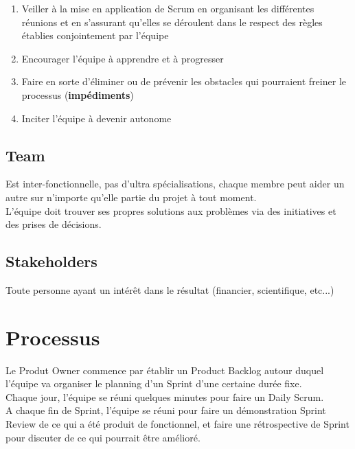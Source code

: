 \documentclass{report}
\begin{document}
			\begin{enumerate}
				\item Veiller à la mise en application de Scrum en organisant les différentes réunions et en s'assurant qu'elles se déroulent dans le respect des règles établies conjointement par l'équipe
				\item Encourager l'équipe à apprendre et à progresser
				\item Faire en sorte d'éliminer ou de prévenir les obstacles qui pourraient freiner le processus (\textbf{impédiments})
				\item Inciter l'équipe à devenir autonome
			\end{enumerate}

		\subsection{Team}

			Est inter-fonctionnelle, pas d'ultra spécialisations, chaque membre peut aider un autre sur n'importe qu'elle partie du projet à tout moment.\\

			L'équipe doit trouver ses propres solutions aux problèmes via des initiatives et des prises de décisions.\\

		\subsection{Stakeholders}

			Toute personne ayant un intérêt dans le résultat (financier, scientifique, etc...)\\

	\section{Processus}

		Le Produt Owner commence par établir un Product Backlog autour duquel l'équipe va organiser le planning d'un Sprint d'une certaine durée fixe.\\

		Chaque jour, l'équipe se réuni quelques minutes pour faire un Daily Scrum.\\

		A chaque fin de Sprint, l'équipe se réuni pour faire un démonstration Sprint Review de ce qui a été produit de fonctionnel, et faire une rétrospective de Sprint pour discuter de ce qui pourrait être amélioré.\\
\end{document}
